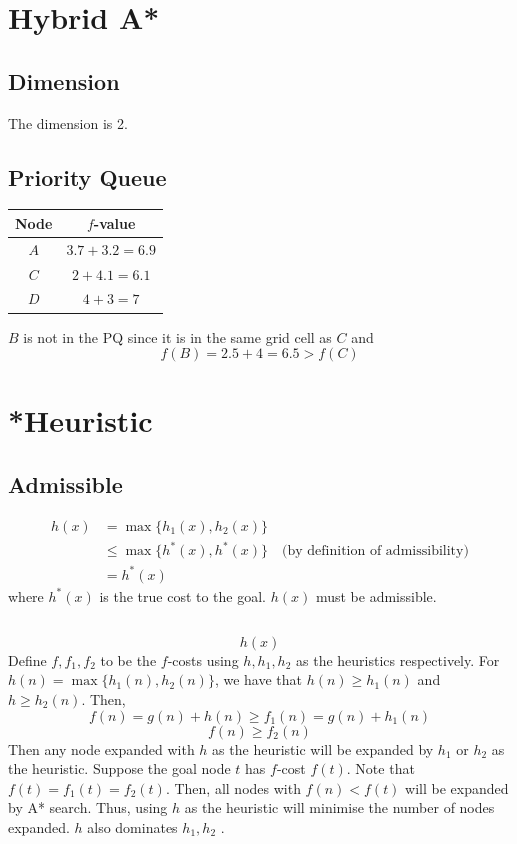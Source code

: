 \newpage
\section{Hybrid A*}
\subsection{Dimension}
The dimension is 2.
\subsection{Priority Queue}
\begin{center}
\begin{tabular}{c c} 
    \hline
    Node &  $f$-value \\ [0.5ex] 
    \hline
    $A$ & $3.7+3.2=6.9$ \\
    $C$ & $2+4.1=6.1$ \\
    $D$ & $4+3=7$ \\
    \hline
\end{tabular}
\end{center}
$B$ is not in the PQ since it is in the same grid cell as $C$ and
\[f(B)=2.5+4=6.5>f(C)\]

\newpage
\section{*Heuristic}

\subsection{Admissible}
\begin{equation}
\begin{aligned}
    h(x)&=\max\{h_1(x),h_2(x)\}\\
    &\leq \max\{h^*(x),h^*(x)\} \quad\text{(by definition of admissibility)}\\
    &=h^*(x)
\end{aligned}
\end{equation}
where $h^*(x)$ is the true cost to the goal. $h(x)$ must be admissible.

\subsection{}
\[h(x)\]
Define $f,f_1,f_2$ to be the $f$-costs using $h,h_1,h_2$ 
as the heuristics respectively.
For $h(n)=\max\{h_1(n),h_2(n)\}$, 
we have that $h(n)\geq h_1(n)$ and $h\geq h_2(n)$.
Then, 
\[f(n)=g(n)+h(n)\geq f_1(n)=g(n)+h_1(n)\]
\[f(n)\geq f_2(n)\]
Then any node expanded with $h$ as the heuristic will be expanded by
$h_1$ or $h_2$ as the heuristic.
Suppose the goal node $t$ has $f$-cost $f(t)$. 
Note that $f(t)=f_1(t)=f_2(t)$.
Then, all nodes with $f(n)<f(t)$ will be expanded by A* search.
Thus, using $h$ as the heuristic will minimise the number of nodes
expanded. $h$ also dominates $h_1,h_2$ \cite{russell18}.


\newpage



